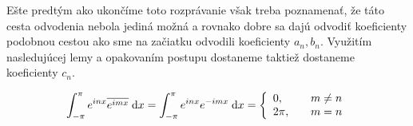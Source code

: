 Ešte predtým ako ukončíme toto rozprávanie však treba poznamenať, že
táto cesta odvodenia nebola jediná možná a rovnako dobre sa dajú
odvodiť koeficienty podobnou cestou ako sme na začiatku odvodili
koeficienty $a_n,b_n$. Využitím nasledujúcej lemy a opakovaním postupu
dostaneme taktiež dostaneme koeficienty $c_n$.
\begin{lema}
    \begin{equation}
    \int_{-\pi}^{\pi} e^{i n x} \overline{e^{i m x}} \; \mathrm{d} x = 
    \int_{-\pi}^{\pi} e^{i n x} e^{-i m x} \; \mathrm{d} x = 
    \left\{
        \begin{array}{l l}
            0,& \quad m\not=n \\
            2\pi,& \quad m=n            
        \end{array}
        \right.
    \end{equation}
\end{lema}
